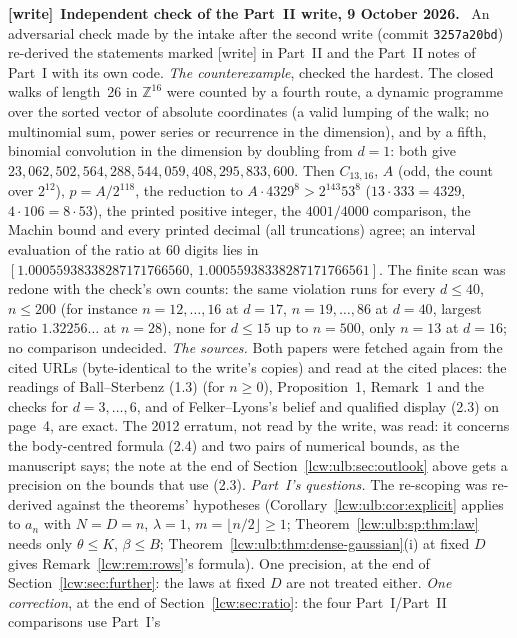 \documentclass[11pt,letterpaper]{article}
\theoremstyle{remark}\newtheorem{remark}[theorem]{Remark}
\newcommand{\file}[1]{\nolinkurl{#1}}
\newenvironment{writenote}[1][]{\par\smallskip\begingroup\small
 \noindent\textbf{[write]}\if\relax\detokenize{#1}\relax\else~\textbf{#1.}\fi\ }%
 {\par\endgroup\smallskip}
\newcommand{\Z}{\mathbb Z}
\begin{document}
\begin{writenote}[Independent check of the Part~II write, 9 October 2026]
An adversarial check made by the intake after the second write (commit
\file{3257a20bd}) re-derived the statements marked [write] in Part~II and the
Part~II notes of Part~I with its own code. \emph{The counterexample}, checked
the hardest. The closed walks of length~26 in $\Z^{16}$ were counted by a
fourth route, a dynamic programme over the sorted vector of absolute
coordinates (a valid lumping of the walk; no multinomial sum, power series or
recurrence in the dimension), and by a fifth, binomial convolution in the
dimension by doubling from $d=1$: both give
$23{,}062{,}502{,}564{,}288{,}544{,}059{,}408{,}295{,}833{,}600$. Then
$C_{13,16}$, $A$ (odd, the count over $2^{12}$), $p=A/2^{118}$, the
reduction to $A\cdot4329^8>2^{143}53^8$ ($13\cdot333=4329$, $4\cdot106=8\cdot53$),
the printed positive integer, the $4001/4000$ comparison, the Machin bound
and every printed decimal (all truncations) agree; an interval evaluation of
the ratio at 60 digits lies in $[1.00055938338287171766560,\,1.00055938338287171766561]$.
The finite scan was redone with the check's own counts: the same violation
runs for every $d\le40$, $n\le200$ (for instance $n=12,\dots,16$ at $d=17$,
$n=19,\dots,86$ at $d=40$, largest ratio $1.32256\ldots$ at $n=28$), none for
$d\le15$ up to $n=500$, only $n=13$ at $d=16$; no comparison undecided.
\emph{The sources.} Both papers were fetched again from the cited URLs
(byte-identical to the write's copies) and read at the cited places: the
readings of Ball--Sterbenz (1.3) (for $n\ge0$), Proposition~1, Remark~1 and
the checks for $d=3,\dots,6$, and of Felker--Lyons's belief and qualified
display (2.3) on page~4, are exact. The 2012 erratum, not read by the write,
was read: it concerns the body-centred formula (2.4) and two pairs of
numerical bounds, as the manuscript says; the note at the end of
Section~\ref{lcw:ulb:sec:outlook} above gets a precision on the bounds that
use (2.3). \emph{Part~I's questions.} The re-scoping was re-derived against
the theorems' hypotheses (Corollary~\ref{lcw:ulb:cor:explicit} applies to
$a_n$ with $N=D=n$, $\lambda=1$, $m=\lfloor n/2\rfloor\ge1$; Theorem~\ref{lcw:ulb:sp:thm:law}
needs only $\theta\le K$, $\beta\le B$; Theorem~\ref{lcw:ulb:thm:dense-gaussian}(i)
at fixed $D$ gives Remark~\ref{lcw:rem:rows}'s formula). One precision, at
the end of Section~\ref{lcw:sec:further}: the laws at fixed $D$ are not
treated either. \emph{One correction}, at the end of
Section~\ref{lcw:sec:ratio}: the four Part~I/Part~II comparisons use Part~I's

\end{writenote}
\end{document}
